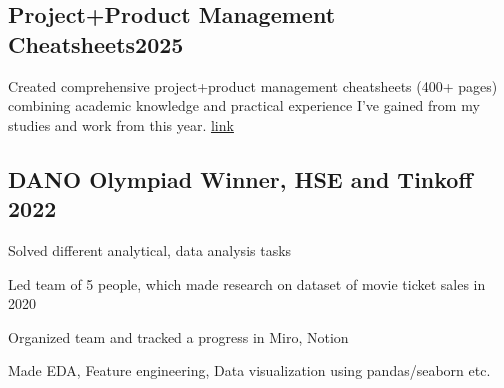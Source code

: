 \documentclass[a4paper, 12pt]{article}
\begin{document}
\subsection {{Project+Product Management Cheatsheets}\hfill 2025}
\begin{zitemize}
\item Created comprehensive project+product management cheatsheets (400+ pages) combining academic knowledge and practical experience I've gained from my studies and work from this year.
\href{http://slavikss.github.io/blog/}{link}
\end{zitemize}

\subsection{{DANO Olympiad Winner, HSE and Tinkoff }\hfill 2022}
\begin{zitemize}
\item Solved different analytical, data analysis tasks
\item Led team of 5 people, which made research on dataset of movie ticket sales in 2020
\item Organized team and tracked a progress in Miro, Notion
\item Made EDA, Feature engineering, Data visualization using pandas/seaborn etc.
\end{zitemize}
\end{document}
